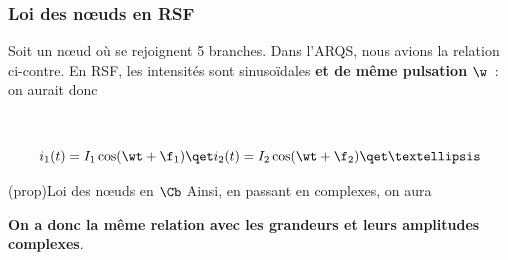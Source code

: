 \documentclass[../../main/main.tex]{subfiles}
\begin{document}
\subsubsection{Loi des nœuds en RSF}
\noindent
\begin{minipage}[t]{.48\linewidth}
	Soit un nœud où se rejoignent 5 branches. Dans l'ARQS, nous avions
	la relation ci-contre. En RSF, les intensités sont sinusoïdales \textbf{et
		de même pulsation} $\w$~: on aurait donc
\end{minipage}
\hfill
\begin{minipage}[t]{.48\linewidth}
	~
	\vspace{-50pt}
	\begin{center}
	\end{center}
\end{minipage}
\[
	i_1(t) = I_1\cos(\wt+\f_1)
	\qet
	i_2(t) = I_2\cos(\wt+\f_2)
	\qet
	…
\]

\begin{tcb}(prop){Loi des nœuds en $\Cb$}
	Ainsi, en passant en complexes, on aura
	\vspace{-15pt}
	\begin{center}
		\textbf{On a donc la même relation avec les grandeurs et leurs amplitudes
			complexes}.
	\end{center}
\end{tcb}
\end{document}
